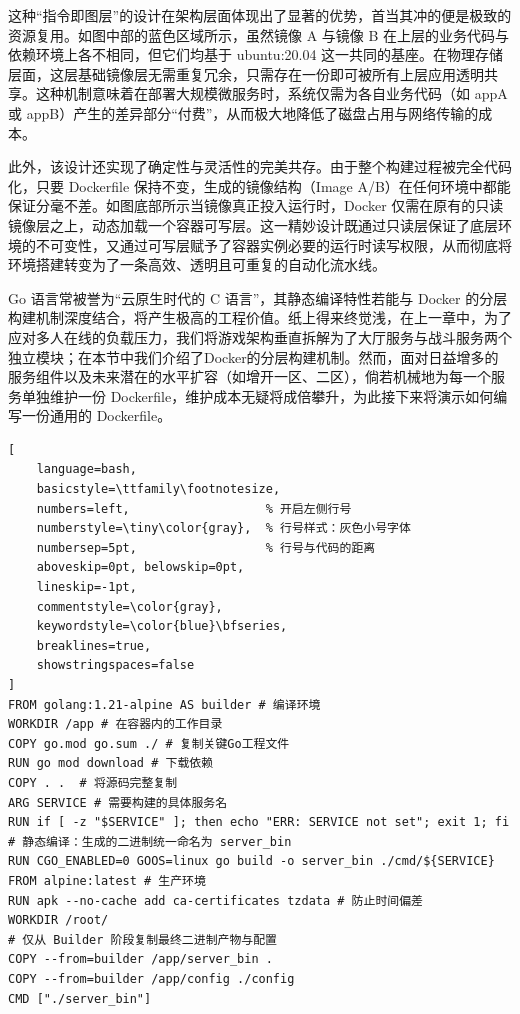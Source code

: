 这种“指令即图层”的设计在架构层面体现出了显著的优势，首当其冲的便是极致的资源复用。如图中部的蓝色区域所示，虽然镜像 A 与镜像 B 在上层的业务代码与依赖环境上各不相同，但它们均基于 ubuntu:20.04 这一共同的基座。在物理存储层面，这层基础镜像层无需重复冗余，只需存在一份即可被所有上层应用透明共享。这种机制意味着在部署大规模微服务时，系统仅需为各自业务代码（如 appA 或 appB）产生的差异部分“付费”，从而极大地降低了磁盘占用与网络传输的成本。

此外，该设计还实现了确定性与灵活性的完美共存。由于整个构建过程被完全代码化，只要 Dockerfile 保持不变，生成的镜像结构（Image A/B）在任何环境中都能保证分毫不差。如图底部所示当镜像真正投入运行时，Docker 仅需在原有的只读镜像层之上，动态加载一个容器可写层。这一精妙设计既通过只读层保证了底层环境的不可变性，又通过可写层赋予了容器实例必要的运行时读写权限，从而彻底将环境搭建转变为了一条高效、透明且可重复的自动化流水线。

Go 语言常被誉为“云原生时代的 C 语言”，其静态编译特性若能与 Docker 的分层构建机制深度结合，将产生极高的工程价值。纸上得来终觉浅，在上一章中，为了应对多人在线的负载压力，我们将游戏架构垂直拆解为了大厅服务与战斗服务两个独立模块；在本节中我们介绍了Docker的分层构建机制。然而，面对日益增多的服务组件以及未来潜在的水平扩容（如增开一区、二区），倘若机械地为每一个服务单独维护一份 Dockerfile，维护成本无疑将成倍攀升，为此接下来将演示如何编写一份通用的 Dockerfile。

\begin{tcolorbox}[title=拆分后的通用Dockerfile]
\begin{lstlisting}[
    language=bash,
    basicstyle=\ttfamily\footnotesize,
    numbers=left,                   % 开启左侧行号
    numberstyle=\tiny\color{gray},  % 行号样式：灰色小号字体
    numbersep=5pt,                  % 行号与代码的距离
    aboveskip=0pt, belowskip=0pt,
    lineskip=-1pt,
    commentstyle=\color{gray},
    keywordstyle=\color{blue}\bfseries,
    breaklines=true,
    showstringspaces=false
]
FROM golang:1.21-alpine AS builder # 编译环境 
WORKDIR /app # 在容器内的工作目录
COPY go.mod go.sum ./ # 复制关键Go工程文件
RUN go mod download # 下载依赖
COPY . .  # 将源码完整复制
ARG SERVICE # 需要构建的具体服务名
RUN if [ -z "$SERVICE" ]; then echo "ERR: SERVICE not set"; exit 1; fi
# 静态编译：生成的二进制统一命名为 server_bin
RUN CGO_ENABLED=0 GOOS=linux go build -o server_bin ./cmd/${SERVICE}
FROM alpine:latest # 生产环境
RUN apk --no-cache add ca-certificates tzdata # 防止时间偏差
WORKDIR /root/
# 仅从 Builder 阶段复制最终二进制产物与配置
COPY --from=builder /app/server_bin .
COPY --from=builder /app/config ./config
CMD ["./server_bin"]
\end{lstlisting}
\end{tcolorbox}

